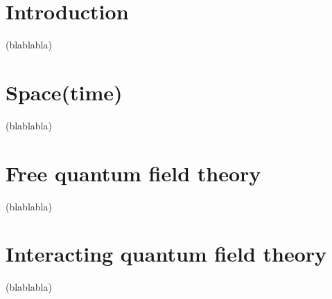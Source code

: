 



\tableofcontents

\chapter{Introduction}

(blablabla)

\chapter{Space(time)}

(blablabla)

\chapter{Free quantum field theory}

(blablabla)

\chapter{Interacting quantum field theory}

(blablabla)







